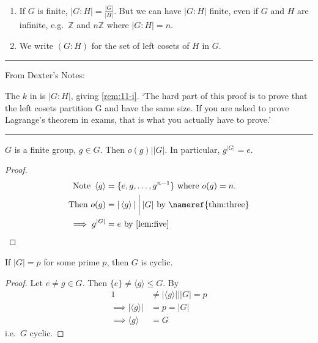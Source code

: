 \begin{remark} ~
    \begin{enumerate}
    \def\labelenumi{\roman{enumi}.}
    \item
    If $G$ is finite, $|G : H| = \frac{|G|}{|H|}$.
    But we can have $|G : H|$ finite, even if $G$ and $H$ are infinite, e.g.~$\mathbb{Z}$ and $n\mathbb{Z}$ where $|G : H| = n$. \label{rem:11-i}
    \item
    We write $(G : H)$ for the set of left cosets of $H$ in $G$.
    \end{enumerate}
\end{remark}

\begin{center}\rule{\linewidth}{0.5pt}\end{center}
From Dexter's Notes:

The $k$ in  is $| G : H |$, giving \cref{rem:11-i}.
`The hard part of this proof is to prove that the left cosets partition G
and have the same size. 
If you are asked to prove Lagrange’s theorem in exams,
that is what you actually have to prove.'
\begin{center}\rule{\linewidth}{0.5pt}\end{center}

\begin{corollary}
\protect\hypertarget{cor:two}{}\label{cor:two}
$G$ is a finite group, $g \in G$.
Then $o(g) \mathbin{\bigg|} |G|$.
In particular, $g^{|G|} = e$.
\end{corollary}

\begin{proof}
\begin{align*}
    \text{Note } \left\langle g\right\rangle &= \{ e, g, \dots, g^{n-1} \} \text{ where } o(g) = n. \\
    \text{Then } o(g) &= |\left\langle g\right\rangle| \mathbin{\bigg|} |G| \text{ by \nameref{thm:three}} \\
    \implies g^{|G|} &= e \text{ by \Cref{lem:five}}
\end{align*}
\end{proof}

\begin{corollary}
\protect\hypertarget{cor:three}{}\label{cor:three}
If $|G| = p$ for some prime $p$, then $G$ is cyclic.
\end{corollary}

\begin{proof}
Let $e \neq g \in G$.
Then $\{ e \} \neq \langle g \rangle \leq G$.
By 
\begin{align*}
    1 &\neq |\langle g \rangle| \mathbin{\bigg|} |G| = p \\
    \implies | \langle g \rangle | &= p = |G| \\
    \implies \langle g \rangle &= G
\end{align*}
i.e.~$G$ cyclic.
\end{proof}

